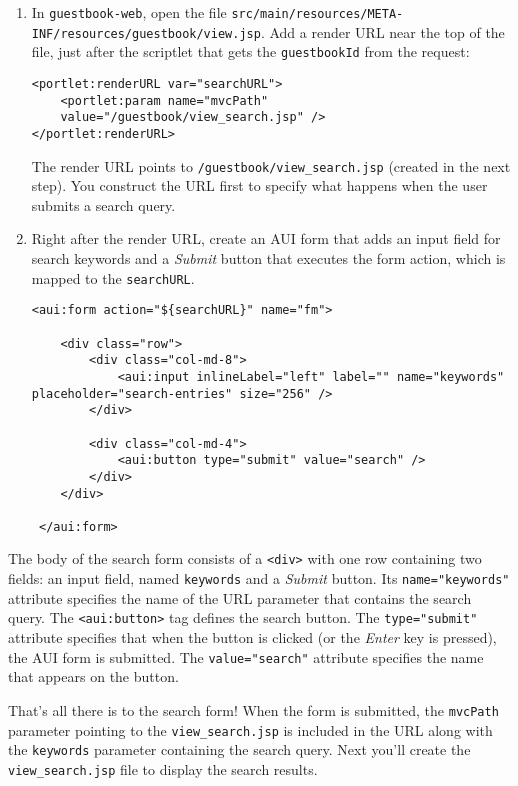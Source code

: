 \begin{enumerate}
\def\labelenumi{\arabic{enumi}.}
\item
  In \texttt{guestbook-web}, open the file
  \texttt{src/main/resources/META-INF/resources/guestbook/view.jsp}. Add
  a render URL near the top of the file, just after the scriptlet that
  gets the \texttt{guestbookId} from the request:

\begin{verbatim}
<portlet:renderURL var="searchURL">
    <portlet:param name="mvcPath" 
    value="/guestbook/view_search.jsp" />
</portlet:renderURL>
\end{verbatim}

  The render URL points to \texttt{/guestbook/view\_search.jsp} (created
  in the next step). You construct the URL first to specify what happens
  when the user submits a search query.
\item
  Right after the render URL, create an AUI form that adds an input
  field for search keywords and a \emph{Submit} button that executes the
  form action, which is mapped to the \texttt{searchURL}.

\begin{verbatim}
<aui:form action="${searchURL}" name="fm">

    <div class="row">
        <div class="col-md-8">
            <aui:input inlineLabel="left" label="" name="keywords" placeholder="search-entries" size="256" />
        </div>

        <div class="col-md-4">
            <aui:button type="submit" value="search" />
        </div>
    </div>

 </aui:form>
\end{verbatim}
\end{enumerate}

The body of the search form consists of a
\texttt{\textless{}div\textgreater{}} with one row containing two
fields: an input field, named \texttt{keywords} and a \emph{Submit}
button. Its \texttt{name="keywords"} attribute specifies the name of the
URL parameter that contains the search query. The
\texttt{\textless{}aui:button\textgreater{}} tag defines the search
button. The \texttt{type="submit"} attribute specifies that when the
button is clicked (or the \emph{Enter} key is pressed), the AUI form is
submitted. The \texttt{value="search"} attribute specifies the name that
appears on the button.

That's all there is to the search form! When the form is submitted, the
\texttt{mvcPath} parameter pointing to the \texttt{view\_search.jsp} is
included in the URL along with the \texttt{keywords} parameter
containing the search query. Next you'll create the
\texttt{view\_search.jsp} file to display the search results.

